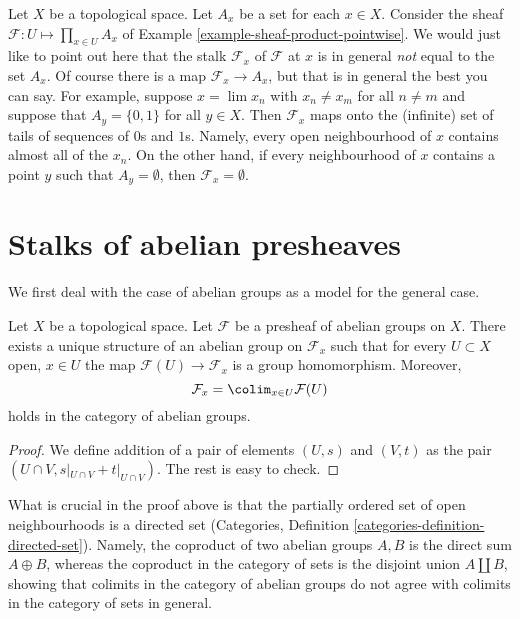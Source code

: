 \begin{example}
\label{example-sheaf-product-pointwise-stalk}
Let $X$ be a topological space. Let $A_x$ be a set for each $x \in X$.
Consider the sheaf $\mathcal{F} : U \mapsto \prod_{x\in U} A_x$ of Example
\ref{example-sheaf-product-pointwise}. We would just like to point
out here that the stalk $\mathcal{F}_x$ of $\mathcal{F}$ at $x$
is in general {\it not} equal to the set $A_x$. Of course there is
a map $\mathcal{F}_x \to A_x$, but that is in general the best you
can say. For example, suppose $x = \lim x_n$ with $x_n \not = x_m$ for
all $n \not = m$ and suppose that $A_y = \{0, 1\}$ for all $y \in X$. Then
$\mathcal{F}_x$ maps onto the (infinite) set of tails of sequences
of $0$s and $1$s. Namely, every open neighbourhood of $x$ contains almost
all of the $x_n$. On the other hand, if every neighbourhood of $x$ contains
a point $y$ such that $A_y = \emptyset$, then $\mathcal{F}_x = \emptyset$.
\end{example}



\section{Stalks of abelian presheaves}
\label{section-stalks-abelian-presheaves}

\noindent
We first deal with the case of abelian groups as
a model for the general case.

\begin{lemma}
\label{lemma-stalk-abelian-presheaf}
Let $X$ be a topological space. Let $\mathcal{F}$ be a presheaf
of abelian groups on $X$. There exists a unique structure of an
abelian group on $\mathcal{F}_x$ such that for every
$U \subset X$ open, $x\in U$ the map $\mathcal{F}(U) \to \mathcal{F}_x$
is a group homomorphism. Moreover,
$$
\mathcal{F}_x
=
\colim_{x\in U} \mathcal{F}(U)
$$
holds in the category of abelian groups.
\end{lemma}

\begin{proof}
We define addition of a pair of elements
$(U, s)$ and $(V, t)$ as the pair $(U \cap V, s|_{U\cap V} +
t|_{U \cap V})$. The rest is easy to check.
\end{proof}

\noindent
What is crucial in the proof above is that the partially ordered set of open
neighbourhoods is a directed set (Categories, Definition
\ref{categories-definition-directed-set}). Namely, the coproduct
of two abelian groups $A, B$ is the direct sum $A \oplus B$, whereas
the coproduct in the category of sets is the disjoint
union $A \amalg B$, showing that colimits in the category
of abelian groups do not agree with colimits in the
category of sets in general.


